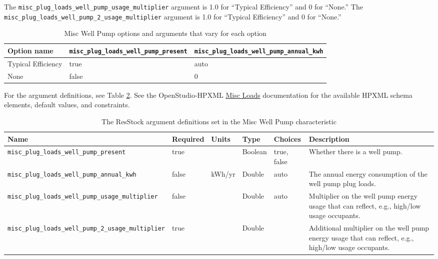 The \texttt{misc\_plug\_loads\_well\_pump\_usage\_multiplier} argument is 1.0 for ``Typical Efficiency'' and 0 for ``None.'' The \texttt{misc\_plug\_loads\_well\_pump\_2\_usage\_multiplier} argument is 1.0 for ``Typical Efficiency'' and 0 for ``None.''

\begin{longtable}[]{ |p{2.5cm}|p{4cm}|p{4cm}| }
\caption{Misc Well Pump options and arguments that vary for each option} \label{table:hc_opt_def_well_pump} \\
\toprule\noalign{}
Option name &
\texttt{misc\_plug\_loads\_well\_pump\_present} &
\texttt{misc\_plug\_loads\_well\_pump\_annual\_kwh} \\
\midrule\noalign{}
\endhead
\bottomrule\noalign{}
\endlastfoot
Typical Efficiency & true & auto \\
None & false & 0 \\
\end{longtable}

For the argument definitions, see Table \ref{table:hc_arg_def_well_pump}. See the OpenStudio-HPXML \href{https://openstudio-hpxml.readthedocs.io/en/v1.8.1/workflow_inputs.html#hpxml-misc-loads}{Misc Loads} documentation for the available HPXML schema elements, default values, and constraints.

\begin{longtable}[]{|p{}|p{1.5cm}|p{1.5cm}|p{1.1cm}|p{2.4cm}|p{4.5cm}|}
\caption{The ResStock argument definitions set in the Misc Well Pump characteristic} \label{table:hc_arg_def_well_pump} \\\toprule\noalign{}
Name & Required & Units & Type & Choices & Description \\
\midrule\noalign{}
\endhead
\bottomrule\noalign{}
\endlastfoot
\texttt{misc\_plug\_loads\_well\_pump\_present} & true & & Boolean &
true, false & Whether there is a well pump. \\
\hline
\texttt{misc\_plug\_loads\_well\_pump\_annual\_kwh} & false & kWh/yr &
Double & auto & The annual energy consumption of the well pump plug
loads.  \\
\hline
\texttt{misc\_plug\_loads\_well\_pump\_usage\_multiplier} & false & &
Double & auto & Multiplier on the well pump energy usage that can
reflect, e.g., high/low usage occupants.\\
\hline
\texttt{misc\_plug\_loads\_well\_pump\_2\_usage\_multiplier} & true & &
Double & & Additional multiplier on the well pump energy usage that can
reflect, e.g., high/low usage occupants. \\
\end{longtable}

